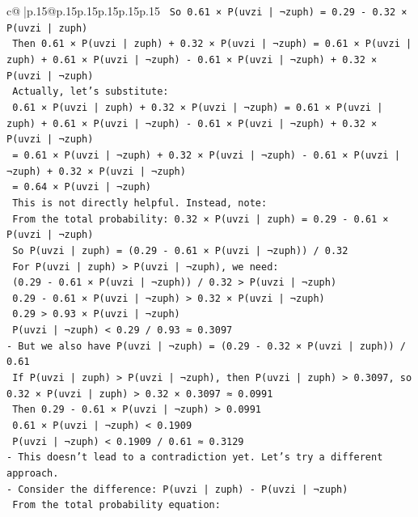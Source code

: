 \documentclass{article}
\begin{document}
{\begin{supertabular}{c@{$\;$}|p{.15\linewidth}@{}p{.15\linewidth}p{.15\linewidth}p{.15\linewidth}p{.15\linewidth}p{.15\linewidth}}
{{{\texttt{  So 0.61 × P(uvzi | ¬zuph) = 0.29 {-} 0.32 × P(uvzi | zuph)} \\
\texttt{  Then 0.61 × P(uvzi | zuph) + 0.32 × P(uvzi | ¬zuph) = 0.61 × P(uvzi | zuph) + 0.61 × P(uvzi | ¬zuph) {-} 0.61 × P(uvzi | ¬zuph) + 0.32 × P(uvzi | ¬zuph)} \\
\texttt{  Actually, let's substitute:} \\
\texttt{  0.61 × P(uvzi | zuph) + 0.32 × P(uvzi | ¬zuph) = 0.61 × P(uvzi | zuph) + 0.61 × P(uvzi | ¬zuph) {-} 0.61 × P(uvzi | ¬zuph) + 0.32 × P(uvzi | ¬zuph)} \\
\texttt{  = 0.61 × P(uvzi | ¬zuph) + 0.32 × P(uvzi | ¬zuph) {-} 0.61 × P(uvzi | ¬zuph) + 0.32 × P(uvzi | ¬zuph)} \\
\texttt{  = 0.64 × P(uvzi | ¬zuph)} \\
\texttt{  This is not directly helpful. Instead, note:} \\
\texttt{  From the total probability: 0.32 × P(uvzi | zuph) = 0.29 {-} 0.61 × P(uvzi | ¬zuph)} \\
\texttt{  So P(uvzi | zuph) = (0.29 {-} 0.61 × P(uvzi | ¬zuph)) / 0.32} \\
\texttt{  For P(uvzi | zuph) > P(uvzi | ¬zuph), we need:} \\
\texttt{  (0.29 {-} 0.61 × P(uvzi | ¬zuph)) / 0.32 > P(uvzi | ¬zuph)} \\
\texttt{  0.29 {-} 0.61 × P(uvzi | ¬zuph) > 0.32 × P(uvzi | ¬zuph)} \\
\texttt{  0.29 > 0.93 × P(uvzi | ¬zuph)} \\
\texttt{  P(uvzi | ¬zuph) < 0.29 / 0.93 ≈ 0.3097} \\
\texttt{{-} But we also have P(uvzi | ¬zuph) = (0.29 {-} 0.32 × P(uvzi | zuph)) / 0.61} \\
\texttt{  If P(uvzi | zuph) > P(uvzi | ¬zuph), then P(uvzi | zuph) > 0.3097, so 0.32 × P(uvzi | zuph) > 0.32 × 0.3097 ≈ 0.0991} \\
\texttt{  Then 0.29 {-} 0.61 × P(uvzi | ¬zuph) > 0.0991} \\
\texttt{  0.61 × P(uvzi | ¬zuph) < 0.1909} \\
\texttt{  P(uvzi | ¬zuph) < 0.1909 / 0.61 ≈ 0.3129} \\
\texttt{{-} This doesn't lead to a contradiction yet. Let's try a different approach.} \\
\texttt{{-} Consider the difference: P(uvzi | zuph) {-} P(uvzi | ¬zuph)} \\
\texttt{  From the total probability equation:} \\
}}}
\end{supertabular}}
\end{document}
